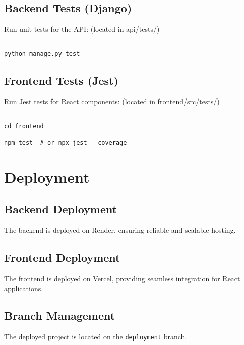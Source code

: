 \documentclass[a4paper,12pt]{article}
\begin{document}
\subsection{Backend Tests (Django)}

Run unit tests for the API: (located in api/tests/)

\begin{verbatim}

python manage.py test

\end{verbatim}



\subsection{Frontend Tests (Jest)}

Run Jest tests for React components: (located in frontend/src/tests/)

\begin{verbatim}

cd frontend

npm test  # or npx jest --coverage

\end{verbatim}



\section{Deployment}



\subsection{Backend Deployment}

The backend is deployed on Render, ensuring reliable and scalable hosting.



\subsection{Frontend Deployment}

The frontend is deployed on Vercel, providing seamless integration for React applications.



\subsection{Branch Management}

The deployed project is located on the \texttt{deployment} branch.
\end{document}
